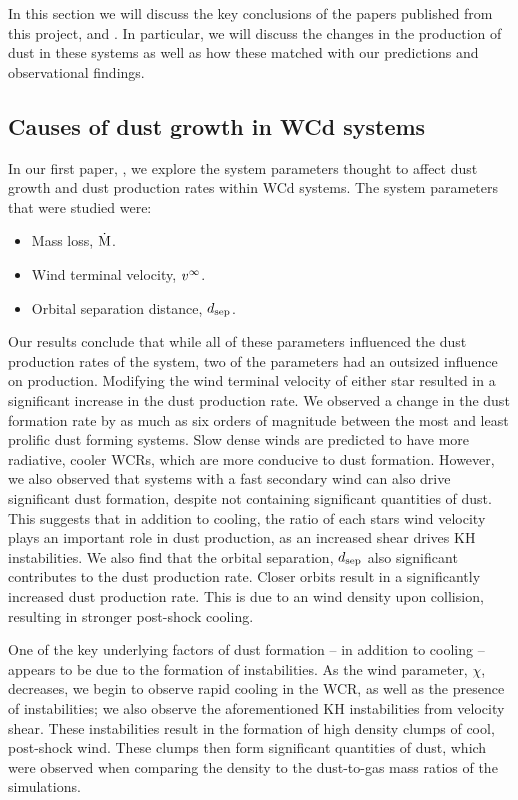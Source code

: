 In this section we will discuss the key conclusions of the papers published from this project, \emph{\firstpapertitle{}} and \emph{\secondpapertitle}.
In particular, we will discuss the changes in the production of dust in these systems as well as how these matched with our predictions and observational findings.

\subsection{Causes of dust growth in WCd systems}

In our first paper, \emph{\firstpapertitle}, we explore the system parameters thought to affect dust growth and dust production rates within WCd systems.
The system parameters that were studied were:

\begin{itemize}
  \item Mass loss, $\dot{\text{M}}$.
  \item Wind terminal velocity, $v^\infty$.
  \item Orbital separation distance, $d_\text{sep}$.
\end{itemize}

\noindent
Our results conclude that while all of these parameters influenced the dust production rates of the system, two of the parameters had an outsized influence on production.
Modifying the wind terminal velocity of either star resulted in a significant increase in the dust production rate.
We observed a change in the dust formation rate by as much as six orders of magnitude between the most and least prolific dust forming systems.
Slow dense winds are predicted to have more radiative, cooler WCRs, which are more conducive to dust formation.
However, we also observed that systems with a fast secondary wind can also drive significant dust formation, despite not containing significant quantities of dust.
This suggests that in addition to cooling, the ratio of each stars wind velocity plays an important role in dust production, as an increased shear drives KH instabilities.
We also find that the orbital separation, $d_\text{sep}$ also significant contributes to the dust production rate.
Closer orbits result in a significantly increased dust production rate.
This is due to an wind density upon collision, resulting in stronger post-shock cooling.

One of the key underlying factors of dust formation -- in addition to cooling -- appears to be due to the formation of instabilities.
As the wind parameter, $\chi$, decreases, we begin to observe rapid cooling in the WCR, as well as the presence of instabilities; we also observe the aforementioned KH instabilities from velocity shear.
These instabilities result in the formation of high density clumps of cool, post-shock wind.
These clumps then form significant quantities of dust, which were observed when comparing the density to the dust-to-gas mass ratios of the simulations.

